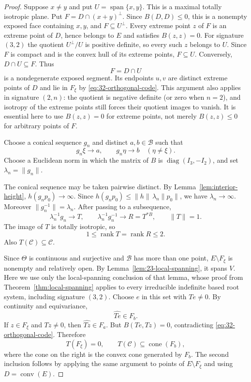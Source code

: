 \documentclass[11pt,reqno]{amsart}
\theoremstyle{plain}
\theoremstyle{definition}
\theoremstyle{remark}
\numberwithin{equation}{section}
\begin{document}
\begin{proof}
Suppose $x\ne y$ and put $U=\operatorname{span}\{x,y\}$.
This is a maximal totally isotropic plane.
Put $F=D\cap(x+y)^\perp$. Since $B(D,D)\leq0$, this is a nonempty exposed face containing $x,y$, and $F\subseteq U^\perp$. Every extreme point $z$ of $F$ is an extreme point of $D$, hence belongs to $E$ and satisfies $B(z,z)=0$.
For signature $(3,2)$ the quotient $U^\perp/U$ is positive definite, so every such $z$ belongs to $U$. Since $F$ is compact and is the convex hull of its extreme points, $F\subseteq U$. Conversely, $D\cap U\subseteq F$. Thus
\[
 F=D\cap U
\]
is a nondegenerate exposed segment. Its endpoints $u,v$ are distinct extreme points of $D$ and lie in $F_\xi$ by \eqref{eq:32-orthogonal-code}.
This argument also applies in signature $(2,n)$: the quotient is negative definite (or zero when $n=2$), and isotropy of the extreme points still forces their quotient images to vanish. It is essential here to use $B(z,z)=0$ for extreme points, not merely $B(z,z)\leq0$ for arbitrary points of $F$.

Choose a conical sequence $g_n$ and distinct
$a,b\in\mathcal B$ such that
\begin{equation}\label{eq:32-conical-sequence}
    g_n\xi\to a,\qquad
    g_n\eta\to b\quad(\eta\ne\xi).
\end{equation}
Choose a Euclidean norm in which the matrix of $B$ is
$\operatorname{diag}(I_3,-I_2)$, and set
$\lambda_n=\|g_n\|$.

The conical sequence may be taken pairwise distinct. By
Lemma~\ref{lem:interior-height}, $h(g_np_0)\to\infty$.
Since $h(g_np_0)\le\|h\|\,\lambda_n\|p_0\|$, we have $\lambda_n\to\infty$.
Moreover $\|g_n^{-1}\|=\lambda_n$.
After passing to a subsequence,
\[
    \lambda_n^{-1}g_n\to T,\qquad
    \lambda_n^{-1}g_n^{-1}\to R=T^{*B},
    \qquad \|T\|=1.
\]
The image of $T$ is totally isotropic, so
\begin{equation}\label{eq:32-rank-bound}
    1\leq\operatorname{rank}T
      =\operatorname{rank}R\leq2.
\end{equation}
Also $T(\mathcal C)\subseteq\mathcal C$.

Since $\Theta$ is continuous and surjective and $\mathcal B$ has
more than one point, $E\setminus F_\xi$ is nonempty and relatively open.
By Lemma~\ref{lem:23-local-spanning}, it spans $V$.
Here we use only the local-spanning conclusion of that lemma,
whose proof from Theorem~\ref{thm:local-spanning} applies to every
irreducible indefinite based root system, including signature $(3,2)$.
Choose $e$ in this set with $Te\ne0$.
By continuity and equivariance,
\[
    \widehat{Te}\in F_b.
\]
If $z\in F_\xi$ and $Tz\ne0$, then
$\widehat{Tz}\in F_a$.
But $B(Te,Tz)=0$, contradicting
\eqref{eq:32-orthogonal-code}.
Therefore
\begin{equation}\label{eq:32-T-image}
    T(F_\xi)=0,\qquad
    T(\mathcal C)\subseteq\operatorname{cone}(F_b),
\end{equation}
where the cone on the right is the convex cone generated
by $F_b$.
The second inclusion follows by applying the same argument
to points of $E\setminus F_\xi$ and using
$D=\operatorname{conv}(E)$.


\end{proof}
\end{document}
